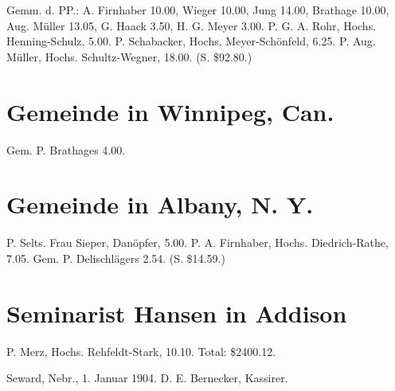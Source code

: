 Gemm. d. PP.: A. Firnhaber 10.00, Wieger 10.00, Jung 14.00, Brathage 10.00, Aug. Müller 13.05, G. Haack 3.50, H. G. Meyer 3.00. P. G. A. Rohr, Hochs. Henning-Schulz, 5.00. P. Schabacker, Hochs. Meyer-Schönfeld, 6.25. P. Aug. Müller, Hochs. Schultz-Wegner, 18.00. (S. \$92.80.)

\section{Gemeinde in Winnipeg, Can.}

Gem. P. Brathages 4.00.

\section{Gemeinde in Albany, N. Y.}

P. Selts. Frau Sieper, Danöpfer, 5.00. P. A. Firnhaber, Hochs. Diedrich-Rathe, 7.05. Gem. P. Delischlägers 2.54. (S. \$14.59.)

\section{Seminarist Hansen in Addison}

P. Merz, Hochs. Rehfeldt-Stark, 10.10. Total: \$2400.12.

Seward, Nebr., 1. Januar 1904. D. E. Bernecker, Kassirer.
